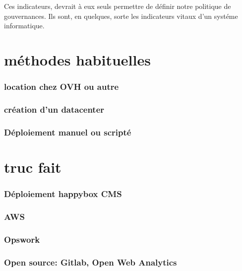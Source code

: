 \documentclass[11pt, a4paper ]{report}
\begin{document}
Ces indicateurs, devrait à eux seuls permettre de définir notre politique de gouvernances. Ils sont, en quelques, sorte les indicateurs vitaux d'un systéme informatique. 

		\section{méthodes habituelles} %
			\subsubsection{location chez OVH ou autre}
			\subsubsection{création d'un datacenter}
			\subsubsection{Déploiement manuel ou scripté}

		\section{truc fait}	 %

			\subsubsection{Déploiement happybox CMS}
			\subsubsection{AWS}

			\subsubsection{Opswork}

			\subsubsection{Open source: Gitlab, Open Web Analytics}
\end{document}

